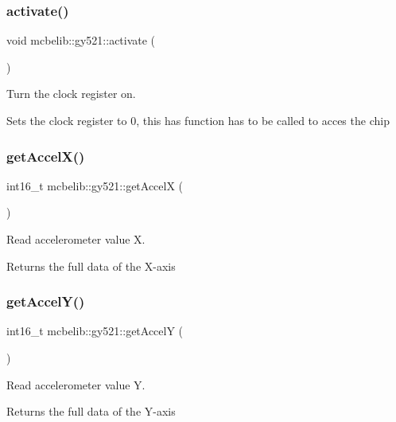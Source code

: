 \subsubsection{\texorpdfstring{activate()}{activate()}}
{\footnotesize\ttfamily void mcbelib\+::gy521\+::activate (\begin{DoxyParamCaption}{ }\end{DoxyParamCaption})}



Turn the clock register on. 

Sets the clock register to 0, this has function has to be called to acces the chip \mbox{\label{classmcbelib_1_1gy521_a65218b1467163b223d091ab309133b8c}} 
\subsubsection{\texorpdfstring{get\+Accel\+X()}{getAccelX()}}
{\footnotesize\ttfamily int16\+\_\+t mcbelib\+::gy521\+::get\+AccelX (\begin{DoxyParamCaption}{ }\end{DoxyParamCaption})}



Read accelerometer value X. 

Returns the full data of the X-\/axis \mbox{\label{classmcbelib_1_1gy521_a57711c636f4541aa442cac6fd9539666}} 
\subsubsection{\texorpdfstring{get\+Accel\+Y()}{getAccelY()}}
{\footnotesize\ttfamily int16\+\_\+t mcbelib\+::gy521\+::get\+AccelY (\begin{DoxyParamCaption}{ }\end{DoxyParamCaption})}



Read accelerometer value Y. 

Returns the full data of the Y-\/axis \mbox{\label{classmcbelib_1_1gy521_ad4b00d9882416e17a518b121c3f46b11}} 
